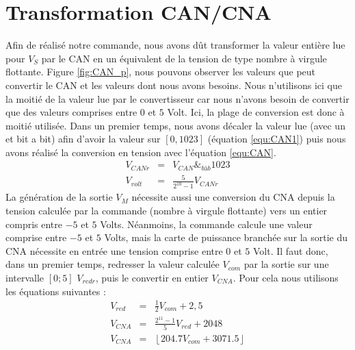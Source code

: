 \section{Transformation CAN/CNA}
Afin de réalisé notre commande, nous avons dût transformer la valeur entière lue pour $V_S$ par le CAN en un équivalent de la tension de type nombre à virgule flottante.  Figure \ref{fig:CAN_p}, nous pouvons observer les valeurs que peut convertir le CAN et les valeurs dont nous avons besoins. Nous n'utilisons ici que la moitié de la valeur lue par le convertisseur car nous n'avons besoin de convertir que des valeurs comprises entre $0$ et $5$ Volt. Ici, la plage de conversion est donc à moitié utilisée. 
Dans un premier temps, nous avons décaler la valeur lue (avec un et bit a bit) afin d'avoir la valeur sur $\left[ 0 , 1023\right]$ (équation \ref{equ:CAN1}) puis  nous avons réalisé la conversion en tension avec l'équation \ref{equ:CAN}.
\begin{eqnarray}
\label{equ:CAN1}V_{CANr} &=& V_{CAN} \&_{bàb} 1023\\
\label{equ:CAN}V_{volt} &=& \frac{5}{2^{10}-1}V_{CANr}
\end{eqnarray}
La génération de la sortie $V_M$ nécessite aussi une conversion du CNA depuis la tension calculée par la commande (nombre à virgule flottante) vers un entier compris entre $-5$ et $5$ Volts. Néanmoins, la commande calcule une valeur comprise entre $-5$ et $5$ Volts, mais la carte de puissance branchée sur la sortie du CNA nécessite en entrée une tension comprise entre $0$ et $5$ Volt. Il faut donc, dans un premier temps, redresser la valeur calculée $V_{com}$ par la sortie sur une intervalle $\left[0;5\right]$ $V_{redr}$, puis le convertir en entier $V_{CNA}$. Pour cela nous utilisons les équations suivantes :
\begin{equation}
\begin{array}{lcl}
V_{red}	&=&	\frac{1}{2}V_{com}+2,5\\
V_{CNA} &=& \frac{2^{11}-1}{5}V_{red}+2048\\
V_{CNA} &=& \left\lfloor 204.7 V_{com} + 3071.5 \right\rfloor
\end{array}
\end{equation}	

